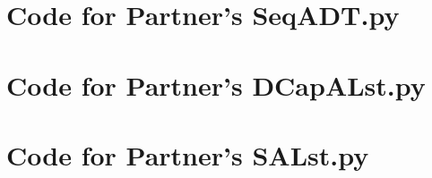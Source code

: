 \documentclass[12pt]{article}
\begin{document}
\noindent 

\newpage

\section{Code for Partner's SeqADT.py}

\noindent 

\newpage

\section{Code for Partner's DCapALst.py}

\noindent 

\newpage

\section{Code for Partner's SALst.py}

\noindent 
\end{document}
